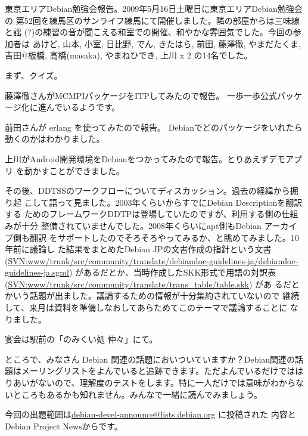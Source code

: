 \documentclass[mingoth,a4paper]{jsarticle}
\begin{document}
東京エリアDebian勉強会報告。2009年5月16日土曜日に東京エリアDebian勉強会の
第52回を練馬区のサンライフ練馬にて開催しました。隣の部屋からは三味線と謡
(?)の練習の音が聞こえる和室での開催、和やかな雰囲気でした。今回の参加者は
あけど, 山本, 小室, 日比野, でん, きたはら, 前田, 藤澤徹, やまだたくま,
吉田@板橋, 高橋(masaka), やまねひでき, 上川 x 2 の14名でした。

まず、クイズ。

藤澤徹さんがMCMPIパッケージをITPしてみたので報告。
一歩一歩公式パッケージ化に進んでいるようです。

前田さんが erlang を使ってみたので報告。
Debianでどのパッケージをいれたら動くのかはわかりました。

上川がAndroid開発環境をDebianをつかってみたので報告。とりあえずデモアプリ
を動かすことができました。

その後、DDTSSのワークフローについてディスカッション。過去の経緯から掘り起
こして語って見ました。2003年くらいからすでにDebian Descriptionを翻訳する
ためのフレームワークDDTPは登場していたのですが、利用する側の仕組みが十分
整備されていませんでした。2008年くらいにapt側もDebian アーカイブ側も翻訳
をサポートしたのでそろそろやってみるか、と眺めてみました。10年前に議論し
た結果をまとめたDebian JPの文書作成の指針という文書
(\url{SVN:www/trunk/src/community/translate/debiandoc-guidelines-ja/debiandoc-guidelines-ja.sgml})
があるだとか、当時作成したSKK形式で用語の対訳表
(\url{SVN:www/trunk/src/community/translate/trans_table/table.skk}) があ
るだとかいう話題が出ました。議論するための情報が十分集約されていないので
継続して、来月は資料を準備しなおしてあらためてこのテーマで議論することに
なりました。

宴会は駅前の「のみくい処 仲々」にて。



ところで、みなさん Debian 関連の話題においついていますか？Debian関連の話
題はメーリングリストをよんでいると追跡できます。ただよんでいるだけではは
りあいがないので、理解度のテストをします。特に一人だけでは意味がわからな
いところもあるかも知れません。みんなで一緒に読んでみましょう。

今回の出題範囲は\url{debian-devel-announce@lists.debian.org} に投稿された
内容とDebian Project Newsからです。

\begin{multicols}{2}
 
\end{multicols}
\end{document}
